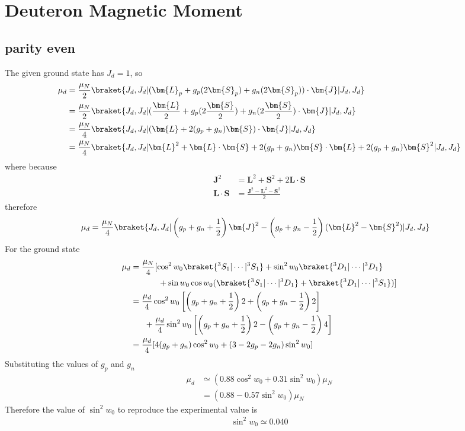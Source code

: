 \section{Deuteron Magnetic Moment}
\subsection{parity even}
The given ground state has $J_d=1$, so
\begin{align*}
    \mu_d&=\frac{\mu_N}{2}\braket{J_d,J_d|(\bm{L}_p+g_p(2\bm{S}_p)+g_n(2\bm{S}_p))\cdot\bm{J}|J_d,J_d}\\
    &=\frac{\mu_N}{2}\braket{J_d,J_d|(\frac{\bm{L}}{2}+g_p(2\frac{\bm{S}}{2})+g_n(2\frac{\bm{S}}{2})\cdot\bm{J}|J_d,J_d}\\
    &=\frac{\mu_N}{4}\braket{J_d,J_d|(\bm{L}+2(g_p+g_n)\bm{S})\cdot\bm{J}|J_d,J_d}\\
    &=\frac{\mu_N}{4}\braket{J_d,J_d|\bm{L}^2+\bm{L}\cdot\bm{S}+2(g_p+g_n)\bm{S}\cdot\bm{L}+2(g_p+g_n)\bm{S}^2|J_d,J_d}
\end{align*}
where because
\begin{align*}
    \bm{J}^2&=\bm{L}^2+\bm{S}^2+2\bm{L}\cdot\bm{S}\\
    \bm{L}\cdot\bm{S}&=\frac{\bm{J}^2-\bm{L}^2-\bm{S}^2}{2}
\end{align*}
therefore
\begin{align*}
    \mu_d&=\frac{\mu_N}{4}\braket{J_d,J_d|\left(g_p+g_n+\frac{1}{2}\right)\bm{J}^2-\left(g_p+g_n-\frac{1}{2}\right)(\bm{L}^2-\bm{S}^2)|J_d,J_d}
\end{align*}
For the ground state
\begin{align*}
    \mu_d&=\frac{\mu_N}{4}[\cos^2{w_0}\braket{^3S_1|\cdots|^3S_1}+\sin^2{w_0}\braket{^3D_1|\cdots|^3D_1}\\
    &\ \ \ \ \ \ \ \ \ \ +\sin{w_0}\cos{w_0}(\braket{^3S_1|\cdots|^3D_1}+\braket{^3D_1|\cdots|^3S_1})]\\
    &=\frac{\mu_d}{4}\cos^2{w_0}\left[\left(g_p+g_n+\frac{1}{2}\right)2+\left(g_p+g_n-\frac{1}{2}\right)2\right]\\
    &\ \ \ \ \ +\frac{\mu_d}{4}\sin^2{w_0}\left[\left(g_p+g_n+\frac{1}{2}\right)2-\left(g_p+g_n-\frac{1}{2}\right)4\right]\\
    &=\frac{\mu_d}{4}[4(g_p+g_n)\cos^2{w_0}+(3-2g_p-2g_n)\sin^2{w_0}]
\end{align*}
Substituting the values of $g_p$ and $g_n$
\begin{align}
    \mu_d&\simeq(0.88\cos^2{w_0}+0.31\sin^2{w_0})\mu_N\nonumber\\
    &=(0.88-0.57\sin^2{w_0})\mu_N
\end{align}
Therefore the value of $\sin^2{w_0}$ to reproduce the experimental value is
\begin{align}
    \sin^2{w_0}\simeq0.040
\end{align}
